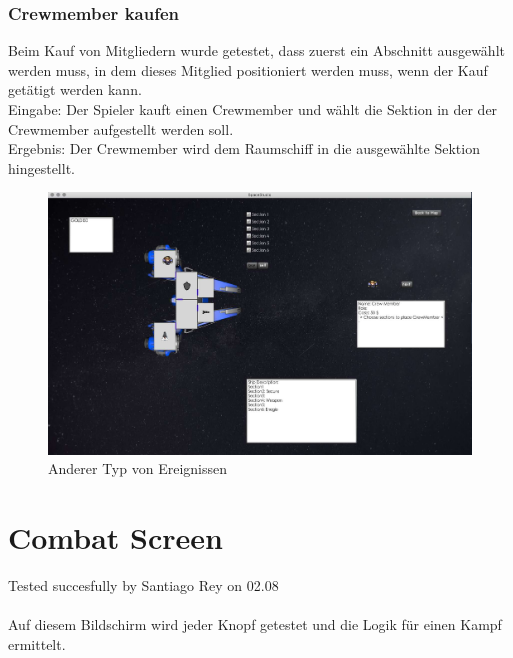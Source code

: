 \documentclass[12pt]{article}
\begin{document}
\subsubsection{Crewmember kaufen}
Beim Kauf von Mitgliedern wurde getestet, dass zuerst ein Abschnitt ausgewählt werden muss, in dem dieses Mitglied positioniert werden muss, wenn der Kauf getätigt werden kann.\\
Eingabe: Der Spieler kauft einen Crewmember und wählt die Sektion in der der Crewmember aufgestellt werden soll.\\
Ergebnis: Der Crewmember wird dem Raumschiff in die ausgewählte Sektion hingestellt.\\
\begin{figure}[htp]
\centering
\includegraphics[scale=0.4]{TestProtocolBilder/crewmemberkaufen.jpg}
\caption{Anderer Typ von Ereignissen}
\end{figure}


\newpage
\section{Combat Screen}
Tested succesfully by Santiago Rey on 02.08\\\\
Auf diesem Bildschirm wird jeder Knopf getestet und die Logik für einen Kampf ermittelt.
\end{document}

